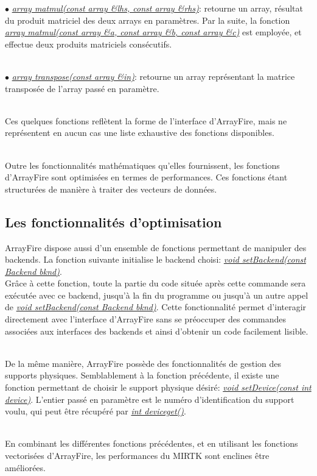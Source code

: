 \documentclass[10pt]{report}
\begin{document}
	{$\bullet$} \underline{\textit{array matmul(const array \&lhs, const array \&rhs)}}: retourne un array, résultat du produit matriciel des deux arrays en paramètres. Par la suite, la fonction \underline{\textit{array matmul(const array \&a, const array \&b, const array \&c)}} est employée, et effectue deux produits matriciels consécutifs. \\~\par
	{$\bullet$} \textit{\underline{array transpose(const array \&in)}}: retourne un array représentant la matrice transposée de l'array passé en paramètre.\\~\par
	
	Ces quelques fonctions reflètent la forme de l'interface d'ArrayFire, mais ne représentent en aucun cas une liste exhaustive des fonctions disponibles.\\~\par
	Outre les fonctionnalités mathématiques qu'elles fournissent, les fonctions d'ArrayFire sont optimisées en termes de performances. Ces fonctions étant structurées de manière à traiter des vecteurs de données.  
	
	\subsection{Les fonctionnalités d'optimisation}
	
	ArrayFire dispose aussi d'un ensemble de fonctions permettant de manipuler des backends. La fonction suivante initialise le backend choisi:
	\underline{\textit{void setBackend(const Backend bknd)}}. \\Grâce à cette fonction, toute la partie du code située après cette commande sera exécutée avec ce backend, jusqu'à la fin du programme ou jusqu'à un autre appel de \underline{\textit{void setBackend(const Backend bknd)}}. Cette fonctionnalité permet d'interagir directement avec l'interface d'ArrayFire sans se préoccuper des commandes associées aux interfaces des backends et ainsi d'obtenir un code facilement lisible.\\~\par
	De la même manière, ArrayFire possède des fonctionnalités de gestion des supports physiques. Semblablement à la fonction précédente, il existe une fonction permettant de choisir le support physique désiré: \textit{\underline{void setDevice(const int device)}}. L'entier passé en paramètre est le numéro d'identification du support voulu, qui peut être récupéré par \underline{\textit{int deviceget()}}.\\~\par
	En combinant les différentes fonctions précédentes, et en utilisant les fonctions vectorisées d'ArrayFire, les performances du MIRTK sont enclines être améliorées.
	
\end{document}
